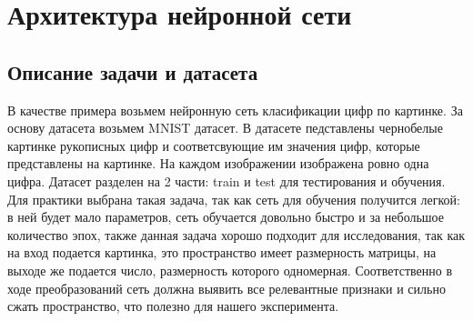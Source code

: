 \section{Архитектура нейронной сети}
\subsection{Описание задачи и датасета}
В качестве примера возьмем нейронную сеть класификации цифр по картинке. За основу датасета возьмем MNIST датасет. В датасете педставлены чернобелые картинке рукописных цифр и соответсвующие им значения цифр, которые представлены на картинке. На каждом изображении изображена ровно одна цифра. Датасет разделен на 2 части: train и test для тестирования и обучения. Для практики выбрана такая задача, так как сеть для обучения получится легкой: в ней будет мало параметров, сеть обучается довольно быстро и за небольшое количество эпох, также данная задача хорошо подходит для исследования, так как на вход подается картинка, это пространство имеет размерность матрицы, на выходе же подается число, размерность которого одномерная. Соответственно в ходе преобразований сеть должна выявить все релевантные признаки и сильно сжать пространство, что полезно для нашего эксперимента.

